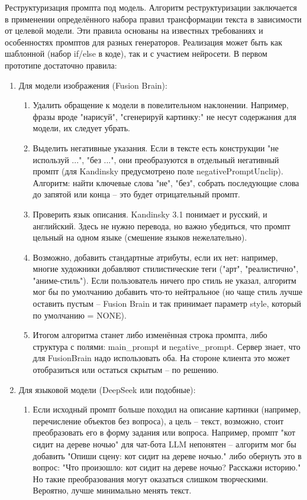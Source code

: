 Реструктуризация промпта под модель. Алгоритм реструктуризации заключается в применении определённого набора правил трансформации текста в зависимости от целевой модели. Эти правила основаны на известных требованиях и особенностях промптов для разных генераторов. Реализация может быть как шаблонной (набор if/else в коде), так и с участием нейросети. В первом прототипе достаточно правила:
\begin{enumerate}[label=\arabic*]
    \item Для модели изображения (Fusion Brain):\begin{enumerate}[label=1.\arabic*]
        \item Удалить обращение к модели в повелительном наклонении. Например, фразы вроде "нарисуй", "сгенерируй картинку:" не несут содержания для модели, их следует убрать.
        \item Выделить негативные указания. Если в тексте есть конструкции "не используй ...", "без ...", они преобразуются в отдельный негативный промпт (для Kandinsky предусмотрено поле negativePromptUnclip). Алгоритм: найти ключевые слова "не", "без", собрать последующие слова до запятой или конца – это будет отрицательный промпт.
        \item Проверить язык описания. Kandinsky 3.1 понимает и русский, и английский\cite{fusionbrain:docs}. Здесь не нужно перевода, но важно убедиться, что промпт цельный на одном языке (смешение языков нежелательно).
        \item Возможно, добавить стандартные атрибуты, если их нет: например, многие художники добавляют стилистические теги ("арт", "реалистично", "аниме-стиль"). Если пользователь ничего про стиль не указал, алгоритм мог бы по умолчанию добавить что-то нейтральное (но чаще стиль лучше оставить пустым – Fusion Brain и так принимает параметр style, который по умолчанию = NONE).
        \item Итогом алгоритма станет либо изменённая строка промпта, либо структура с полями: main\_prompt и negative\_prompt. Сервер знает, что для FusionBrain надо использовать оба. На стороне клиента это может отобразиться или остаться скрытым – по решению.
    \end{enumerate}
    \item Для языковой модели (DeepSeek или подобные): 
    \begin{enumerate}[label=2.\arabic*]
        \item Если исходный промпт больше походил на описание картинки (например, перечисление объектов без вопроса), а цель – текст, возможно, стоит преобразовать его в форму задания или вопроса. Например, промпт "кот сидит на дереве ночью" для чат-бота LLM непонятен – алгоритм мог бы добавить "Опиши сцену: кот сидит на дереве ночью." либо обернуть это в вопрос: "Что произошло: кот сидит на дереве ночью? Расскажи историю." Но такие преобразования могут оказаться слишком творческими. Вероятно, лучше минимально менять текст.

\end{enumerate}
\end{enumerate}
